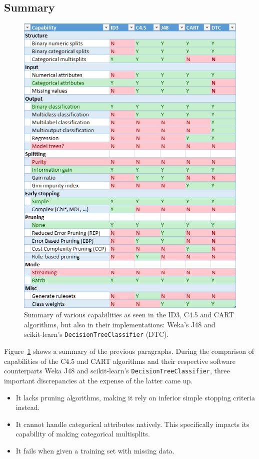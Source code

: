 \subsection{Summary}

\begin{figure}[p]
    \centering
    \includegraphics[width=\textwidth]{img/capabilities.png}
    \caption{Summary of various capabilities as seen in the ID3, C4.5 and CART algorithms, but also in their implementations: Weka's J48 and scikit-learn's \texttt{DecisionTreeClassifier} (DTC).}%
    \label{fig:capabilities}
\end{figure}

Figure~\ref{fig:capabilities} shows a summary of the previous paragraphs. During the comparison of capabilities of the C4.5 and CART algorithms and their respective software counterparts Weka J48 and scikit-learn's \texttt{DecisionTreeClassifier}, three important discrepancies at the expense of the latter came up. 
\begin{itemize}
    \item It lacks pruning algorithms, making it rely on inferior simple stopping criteria instead.
    \item It cannot handle categorical attributes natively. This specifically impacts its capability of making categorical multisplits.
    \item It fails when given a training set with missing data.
\end{itemize}

